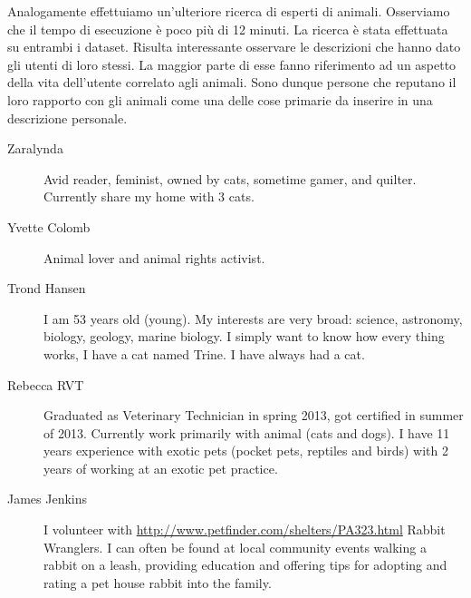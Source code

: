 Analogamente effettuiamo un'ulteriore ricerca di esperti di animali. Osserviamo che il tempo di esecuzione è poco più di 12 minuti. La ricerca è stata effettuata su entrambi i dataset. Risulta interessante osservare le descrizioni che hanno dato gli utenti di loro stessi. La maggior parte di esse fanno riferimento ad un aspetto della vita dell'utente correlato agli animali. Sono dunque persone che reputano il loro rapporto con gli animali come una delle cose primarie da inserire in una descrizione personale.

\begin{description}
	\item[Zaralynda]Avid reader, feminist, owned by cats, sometime gamer, and quilter.
	Currently share my home with 3 cats.
	\item[Yvette Colomb]Animal lover and animal rights activist.
	\item[Trond Hansen]I am 53 years old (young). My interests are very broad: science, astronomy, biology, geology, marine biology. I simply want to know how every thing works, I have a cat named Trine. I have always had a cat.
	\item[Rebecca RVT]Graduated as Veterinary Technician in spring 2013, got certified in summer of 2013. Currently work primarily with  animal (cats and dogs). I have 11 years experience with exotic pets (pocket pets, reptiles and birds) with 2 years of working at an exotic pet practice.
	\item[James Jenkins]I volunteer with \url{http://www.petfinder.com/shelters/PA323.html} Rabbit Wranglers. I can often be found at local community events walking a rabbit on a leash, providing education and offering tips for adopting and rating a pet house rabbit into the family.
	
\end{description}


